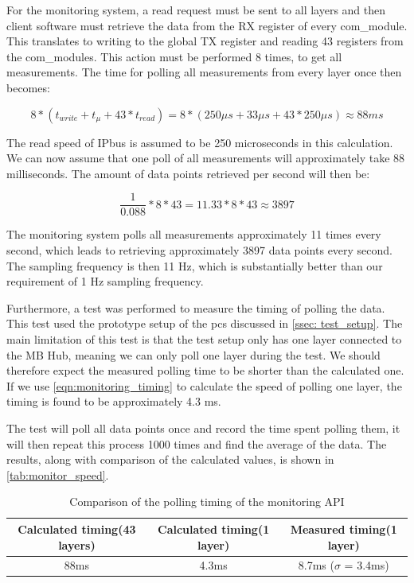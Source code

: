 \documentclass[main.tex]{subfiles}
\begin{document}
 For the monitoring system, a read request must be sent to all layers and then client software must retrieve the data from the RX register of every com\_module. This translates to writing to the global TX register and reading 43 registers from the com\_modules. This action must be performed 8 times, to get all measurements. The time for polling all measurements from every layer once then becomes:

\begin{equation} \label{eqn:monitoring_timing}
8*(t_{write}+t_{\mu } + 43*t_{read}) = 8*(250\mu s + 33 \mu s + 43*250\mu s) \approx 88 ms
\end{equation}

The read speed of IPbus is assumed to be 250 microseconds in this calculation. We can now assume that one poll of all measurements will approximately take 88 milliseconds. The amount of data points retrieved per second will then be:

\begin{equation} \label{eqn:data_points_per_second}
\frac{1}{0.088}*8*43 =  11.33 * 8*43 \approx 3897
\end{equation}

The monitoring system polls all measurements approximately 11 times every second, which leads to retrieving approximately 3897 data points every second. The sampling frequency is then 11 Hz,  which is substantially better than our requirement of 1 Hz sampling frequency.

Furthermore, a test was performed to measure the timing of polling the data. This test used the prototype setup of the \gls{pcs} discussed in \autoref{ssec: test_setup}. The main limitation of this test is that the test setup only has one layer connected to the MB Hub, meaning we can only poll one layer during the test. We should therefore expect the measured polling time to be shorter than the calculated one. If we use \autoref{eqn:monitoring_timing} to calculate the speed of polling one layer, the timing is found to be approximately 4.3 ms.

The test will poll all data points once and record the time spent polling them, it will then repeat this process 1000 times and find the average of the data. The results, along with comparison of the calculated values, is shown in \autoref{tab:monitor_speed}.

\begin{table}[h]
\centering
\begin{tabular}{||c c c||} 
 \hline
  Calculated timing(43 layers) & Calculated timing(1 layer) & Measured timing(1 layer) \\ [0.5ex] 
 \hline\hline
    88ms & 4.3ms & 8.7ms ($\sigma$ = 3.4ms) \\  [1ex] 
 \hline
\end{tabular}
\caption{\label{tab:monitor_speed} Comparison of the polling timing of the monitoring API}
\end{table}
\FloatBarrier
\end{document}
